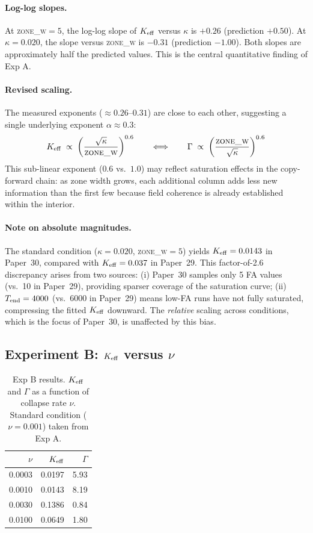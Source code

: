 \documentclass[11pt,a4paper]{article}
\begin{document}
\paragraph{Log-log slopes.}
At \textsc{zone\_w}$=5$, the log-log slope of $K_{\rm eff}$ versus $\kappa$ is
$+0.26$ (prediction $+0.50$).
At $\kappa=0.020$, the slope versus \textsc{zone\_w} is $-0.31$ (prediction $-1.00$).
Both slopes are approximately half the predicted values. This is the central quantitative
finding of Exp A.

\paragraph{Revised scaling.}
The measured exponents ($\approx 0.26$--$0.31$) are close to each other, suggesting a
single underlying exponent $\alpha \approx 0.3$:
\begin{equation}
K_{\rm eff} \;\propto\; \left(\frac{\sqrt{\kappa}}{\textsc{zone\_w}}\right)^{0.6}
\qquad \Longleftrightarrow \qquad
\Gamma \;\propto\; \left(\frac{\textsc{zone\_w}}{\sqrt{\kappa}}\right)^{0.6}
\label{eq:revised}
\end{equation}
This sub-linear exponent ($0.6$ vs.\ $1.0$) may reflect saturation effects in the
copy-forward chain: as zone width grows, each additional column adds less new information
than the first few because field coherence is already established within the interior.

\paragraph{Note on absolute magnitudes.}
The standard condition ($\kappa=0.020$, \textsc{zone\_w}$=5$) yields $K_{\rm eff}=0.0143$
in Paper~30, compared with $K_{\rm eff}=0.037$ in Paper~29.  This factor-of-2.6
discrepancy arises from two sources: (i) Paper~30 samples only 5 FA values
(vs.\ 10 in Paper~29), providing sparser coverage of the saturation curve;
(ii) $T_{\rm end}=4000$ (vs.\ $6000$ in Paper~29) means low-FA runs have not fully
saturated, compressing the fitted $K_{\rm eff}$ downward.  The \emph{relative} scaling
across conditions, which is the focus of Paper~30, is unaffected by this bias.

\subsection{Experiment B: $K_{\rm eff}$ versus $\nu$}

\begin{table}[h]
\centering
\caption{Exp B results. $K_{\rm eff}$ and $\Gamma$ as a function of collapse rate $\nu$.
  Standard condition ($\nu=0.001$) taken from Exp A.}
\label{tab:expB}
\begin{tabular}{r|rr}
\toprule
$\nu$ & $K_{\rm eff}$ & $\Gamma$ \\
\midrule
0.0003 & 0.0197 & 5.93 \\
0.0010 & 0.0143 & 8.19 \\
0.0030 & 0.1386 & 0.84 \\
0.0100 & 0.0649 & 1.80 \\
\bottomrule
\end{tabular}
\end{table}
\end{document}
